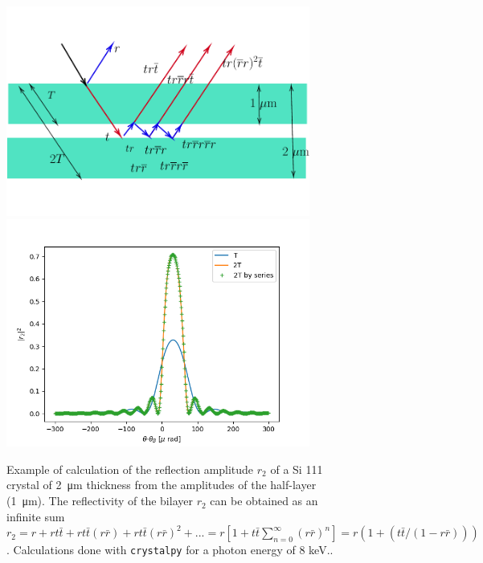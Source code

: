 \documentclass{iucr}
\begin{document}
\begin{figure}\label{fig:doublelayer}
    \centering
    \includegraphics[width=0.89\textwidth]{figures/figlayered2.pdf}
    \includegraphics[width=0.89\textwidth]{figures/doublelayer2.png}
    \caption{Example of calculation of the reflection amplitude $r_2$ of a Si 111 crystal of \SI{2}{\micro\meter} thickness from the amplitudes of the half-layer (\SI{1}{\micro\meter}). The reflectivity of the bilayer $r_2$ can be obtained as an infinite sum $r_2 = r + r t \bar{t} + r t \bar{t} (r \bar{r}) + r t \bar{t} (r \bar{r})^2 + ...= r[1 + t \bar{t}\sum_{n=0}^{\infty}(r\bar{r})^n]=r(1 + (t \bar{t} / (1-r \bar{r})))$. Calculations done with {\tt crystalpy} for a photon energy of 8 keV..}
\end{figure}
\end{document}
